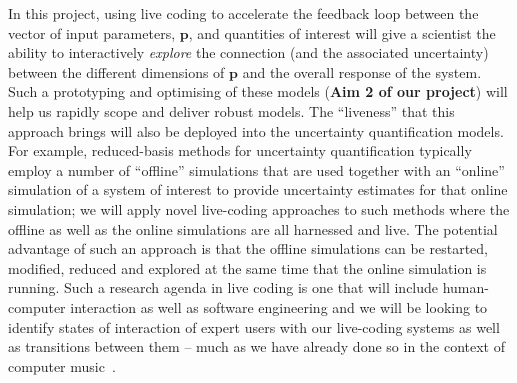 In this project, using live coding to accelerate the feedback loop between the vector of input parameters,
$\mathbf{p}$,  and quantities of interest  will give a scientist the ability to interactively
\emph{explore} the connection (and the associated uncertainty) between
the different dimensions of $\mathbf{p}$ and the overall response of
the system. Such a prototyping and optimising of these models ({\bf Aim 2 of our project}) will help us rapidly scope and deliver 
robust models. The ``liveness'' that this approach brings will also be deployed 
into the uncertainty quantification models. For example, reduced-basis methods for uncertainty 
quantification typically employ a number of ``offline'' simulations that are used together with an ``online'' simulation of 
a system of interest to provide uncertainty estimates for that online simulation; we will apply novel live-coding
approaches to such methods where the offline as well as the online simulations are all harnessed and live. The 
potential advantage of such an approach is that the offline simulations can be restarted, modified, reduced and 
explored at the same time that the online simulation is running. Such a research agenda in live coding is one that will
include human-computer interaction as well as software engineering and we will be looking to identify states of interaction 
of expert users with our live-coding systems as well as transitions between them -- much as we have already done so in the 
context of computer music~\parencite{swift2014coding}.








